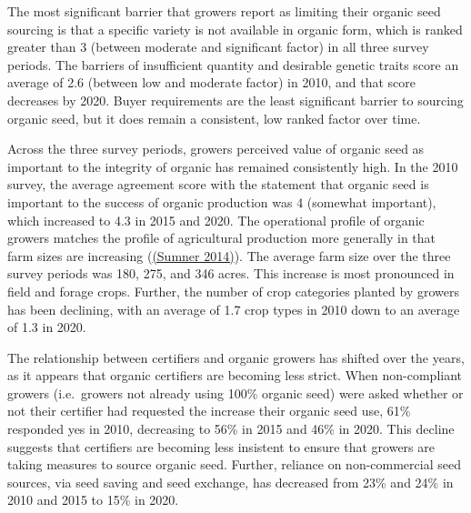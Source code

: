 \documentclass[twoside,12pt,final]{ucthesis-CA2012}
\begin{document}
\begin{ucmainmatter}
The most significant barrier that growers report as limiting their
organic seed sourcing is that a specific variety is not available in
organic form, which is ranked greater than 3 (between moderate and
significant factor) in all three survey periods. The barriers of
insufficient quantity and desirable genetic traits score an average of
2.6 (between low and moderate factor) in 2010, and that score decreases
by 2020. Buyer requirements are the least significant barrier to
sourcing organic seed, but it does remain a consistent, low ranked
factor over time.

Across the three survey periods, growers\textquotesingle{} perceived value of organic
seed as important to the integrity of organic has remained consistently
high. In the 2010 survey, the average agreement score with the statement
that organic seed is important to the success of organic production was
4 (somewhat important), which increased to 4.3 in 2015 and 2020. The
operational profile of organic growers matches the profile of
agricultural production more generally in that farm sizes are increasing
(\href{https://www.zotero.org/google-docs/?nfiL40}{(Sumner 2014)}). The
average farm size over the three survey periods was 180, 275, and 346
acres. This increase is most pronounced in field and forage crops.
Further, the number of crop categories planted by growers has been
declining, with an average of 1.7 crop types in 2010 down to an average
of 1.3 in 2020.

The relationship between certifiers and organic growers has shifted over
the years, as it appears that organic certifiers are becoming less
strict. When non-compliant growers (i.e.~growers not already using 100\%
organic seed) were asked whether or not their certifier had requested
the increase their organic seed use, 61\% responded yes in 2010,
decreasing to 56\% in 2015 and 46\% in 2020. This decline suggests that
certifiers are becoming less insistent to ensure that growers are taking
measures to source organic seed. Further, reliance on non-commercial
seed sources, via seed saving and seed exchange, has decreased from 23\%
and 24\% in 2010 and 2015 to 15\% in 2020.
\begin{table}


\end{table}
\end{ucmainmatter}
\end{document}
